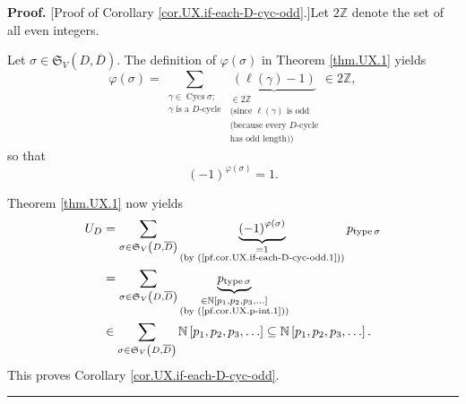 \documentclass[numbers=enddot,12pt,final,onecolumn,notitlepage]{scrartcl}%
\numberwithin{exer}{section}
\theoremstyle{definition}
\newenvironment{proof}[1][Proof]{\noindent\textbf{#1.} }{\ \rule{0.5em}{0.5em}}
\let\sumnonlimits\sum
\renewcommand{\sum}{\sumnonlimits\limits}
\begin{document}
\begin{proof}
[Proof of Corollary \ref{cor.UX.if-each-D-cyc-odd}.]Let $2\mathbb{Z}$ denote
the set of all even integers.

Let $\sigma\in\mathfrak{S}_{V}\left(  D,\overline{D}\right)  $. The definition
of $\varphi\left(  \sigma\right)  $ in Theorem \ref{thm.UX.1} yields%
\[
\varphi\left(  \sigma\right)  =\sum_{\substack{\gamma\in\operatorname*{Cycs}%
\sigma;\\\gamma\text{ is a }D\text{-cycle}}}\underbrace{\left(  \ell\left(
\gamma\right)  -1\right)  }_{\substack{\in2\mathbb{Z}\\\text{(since }%
\ell\left(  \gamma\right)  \text{ is odd}\\\text{(because every }%
D\text{-cycle}\\\text{has odd length))}}}\in2\mathbb{Z},
\]
so that%
\begin{equation}
\left(  -1\right)  ^{\varphi\left(  \sigma\right)  }=1.
\label{pf.cor.UX.if-each-D-cyc-odd.1}%
\end{equation}


Theorem \ref{thm.UX.1} now yields%
\begin{align*}
U_{D}  &  =\sum_{\sigma\in\mathfrak{S}_{V}\left(  D,\overline{D}\right)
}\underbrace{\left(  -1\right)  ^{\varphi\left(  \sigma\right)  }%
}_{\substack{=1\\\text{(by (\ref{pf.cor.UX.if-each-D-cyc-odd.1}))}%
}}p_{\operatorname*{type}\sigma}\\
&  =\sum_{\sigma\in\mathfrak{S}_{V}\left(  D,\overline{D}\right)
}\underbrace{p_{\operatorname*{type}\sigma}}_{\substack{\in\mathbb{N}\left[
p_{1},p_{2},p_{3},\ldots\right]  \\\text{(by (\ref{pf.cor.UX.p-int.1}))}}}\\
&  \in\sum_{\sigma\in\mathfrak{S}_{V}\left(  D,\overline{D}\right)
}\mathbb{N}\left[  p_{1},p_{2},p_{3},\ldots\right]  \subseteq\mathbb{N}\left[
p_{1},p_{2},p_{3},\ldots\right]  .
\end{align*}
This proves Corollary \ref{cor.UX.if-each-D-cyc-odd}.
\end{proof}
\end{document}
